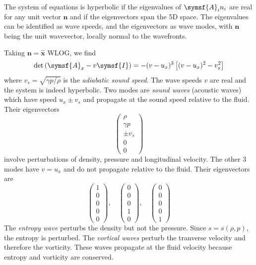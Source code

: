 \documentclass{jknotes}
\begin{document}
The system of equations is hyperbolic if the eigenvalues of $\symsf{A}_i n_i$ are real
for any unit vector $\symbf{n}$ and if the eigenvectors span the 5D space. The
eigenvalues can be identified as wave speeds, and the eigenvectors as wave
modes, with $\symbf{n}$ being the unit wavevector, locally normal to the
wavefronts. 

Taking $\symbf{n} = \hat{\symbf{x}}$ WLOG, we find
\begin{equation}
	\text{det}\left( \symsf{A}_x - v \symsf{I}\right) = - (v-u_x)^3 \left[
	(v-u_x)^2 - v_s^2 \right]
\end{equation}
where $v_s = \sqrt{\gamma p / \rho}$ is the \emph{adiabatic sound speed}. The
wave speeds $v$ are real and the system is indeed hyperbolic. Two modes are
\emph{sound waves} (acoustic waves) which have speed $u_x \pm v_s$ and
propagate at the sound speed relative to the fluid. Their eigenvectors
\begin{equation}
	\begin{pmatrix} \rho \\ \gamma p \\ \pm v_s \\0 \\ 0 \end{pmatrix}
\end{equation}
involve perturbations of density, pressure and longitudinal velocity. The
other 3 modes have $v = u_x$ and do not propagate relative to the fluid. Their
eigenvectors are
\begin{equation}
	\begin{pmatrix} 1  \\ 0 \\ 0 \\ 0 \\ 0 \end{pmatrix}, \hspace{1em}
	\begin{pmatrix} 0  \\ 0 \\ 0 \\ 1 \\ 0 \end{pmatrix}, \hspace{1em}
	\begin{pmatrix} 0  \\ 0 \\ 0 \\ 0 \\ 1 \end{pmatrix}
\end{equation}
The \emph{entropy wave} perturbs the density but not the pressure. Since $s =
s(\rho, p)$, the entropy is perturbed. The \emph{vortical waves} perturb the
tranverse velocity and therefore the vorticity. These waves propagate at the
fluid velocity because entropy and vorticity are conserved. 
\end{document}
